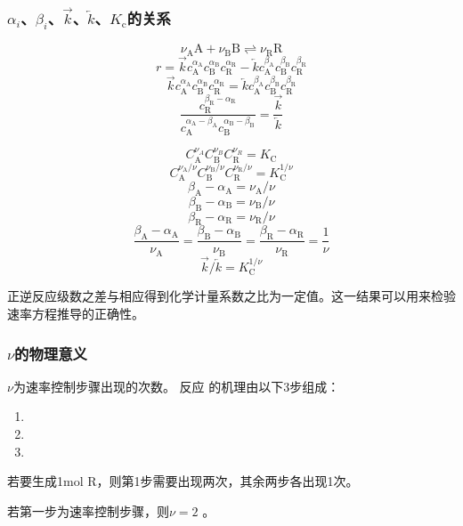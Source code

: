 \begin{frame}
    \frametitle{$\alpha_i$、$\beta_i$、$\overrightarrow{k}$、$\overleftarrow{k}$、$K_\mathrm{c}$的关系}
    \begin{minipage}{0.48\linewidth}
        \[
            \nu_\mathrm{A}\mathrm{A}+\nu_\mathrm{B}\mathrm{B}\rightleftharpoons \nu_\mathrm{R}\mathrm{R}
        \]
        \[
            r =\vec{k}c_\mathrm{A}^{\alpha_\mathrm{A}}c_\mathrm{B}^{\alpha_\mathrm{B}}c_\mathrm{R}^{\alpha_\mathrm{R}}-\overleftarrow{k}c_\mathrm{A}^{\beta_\mathrm{A}}c_\mathrm{B}^{\beta_\mathrm{B}}c_\mathrm{R}^{\beta_\mathrm{R}}
        \]
        \[
            \vec{k}c_\mathrm{A}^{\alpha_\mathrm{A}}c_\mathrm{B}^{\alpha_\mathrm{B}}c_\mathrm{R}^{\alpha_\mathrm{R}}=\overleftarrow{k}c_\mathrm{A}^{\beta_\mathrm{A}}c_\mathrm{B}^{\beta_\mathrm{B}}c_\mathrm{R}^{\beta_\mathrm{R}}
        \]
        \[
            \frac{c_\mathrm{R}^{\beta_\mathrm{R}-\alpha_\mathrm{R}}}{c_\mathrm{A}^{\alpha_\mathrm{A}-\beta_\mathrm{A}}c_\mathrm{B}^{\alpha_\mathrm{B}-\beta_\mathrm{B}}}=\frac{\vec{k}}{\overleftarrow{k}}
        \]
    \end{minipage}\hfill
    \begin{minipage}{0.48\linewidth}
        \[
            C_{\mathrm{A}}^{\nu_{A}}C_{\mathrm{B}}^{\nu_{B}}C_{\mathrm{R}}^{\nu_{R}}=K_{\mathrm{C}}
        \]
        \[
            C_{\mathrm{A}}^{\nu_{\mathrm{A}}/\nu}C_{\mathrm{B}}^{\nu_{\mathrm{B}}/\nu}C_{\mathrm{R}}^{\nu_{\mathrm{R}}/\nu}=K_{\mathrm{C}}^{1/\nu}
        \]
        \[
            \beta_{\mathrm{A}}-\alpha_{\mathrm{A}}=\nu_{\mathrm{A}}/\nu
        \]
        \[
            \beta_{\mathrm{B}}-\alpha_{\mathrm{B}}= \nu_{\mathrm{B}}/\nu
        \]
        \[
            \beta_{\mathrm{R}}-\alpha_{\mathrm{R}} =\nu_{\mathrm{R}}/\nu 
        \]
        \[
            \frac{\beta_\mathrm{A}-\alpha_\mathrm{A}}{\nu_\mathrm{A}}=\frac{\beta_\mathrm{B}-\alpha_\mathrm{B}}{\nu_\mathrm{B}}=\frac{\beta_\mathrm{R}-\alpha_\mathrm{R}}{\nu_\mathrm{R}}=\frac{1}{\nu}
        \]
        \[
            \vec{k}/\overleftarrow{k}=K_{\mathrm{C}}^{1/\nu}
        \]
    \end{minipage}

    正逆反应级数之差与相应得到化学计量系数之比为一定值。这一结果可以用来检验速率方程推导的正确性。
\end{frame}


\begin{frame}
    \frametitle{$\nu$的物理意义}
    $\nu$为速率控制步骤出现的次数。
反应  的机理由以下3步组成：
\begin{enumerate}
  \item {}
  \item {}
  \item {}
\end{enumerate}
若要生成1mol R，则第1步需要出现两次，其余两步各出现1次。

若第一步为速率控制步骤，则$\nu = 2$ 。
\end{frame}


